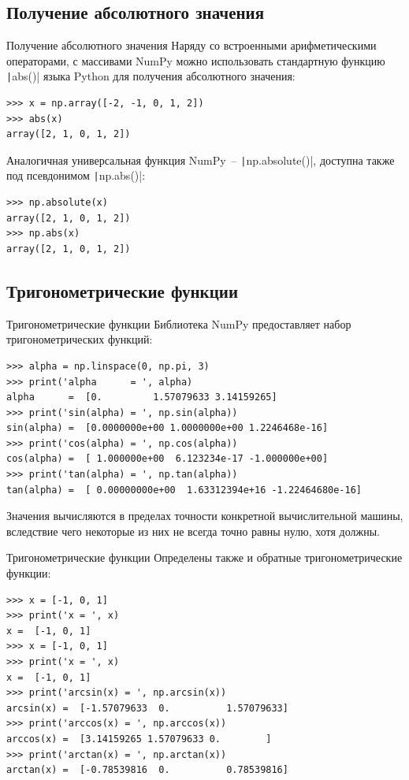 \documentclass[aspectratio=169, mathserif]{beamer}	%
\begin{document}
\subsection{Получение абсолютного значения}
\begin{frame}[fragile]{Получение абсолютного значения}
\scriptsize
Наряду со встроенными арифметическими операторами, с массивами NumPy можно использовать стандартную функцию \texttt|abs()| языка Python для получения абсолютного значения:

\begin{verbatim}
>>> x = np.array([-2, -1, 0, 1, 2])
>>> abs(x)
array([2, 1, 0, 1, 2])
\end{verbatim}

Аналогичная универсальная функция NumPy~-- \texttt|np.absolute()|, доступна также под псевдонимом \texttt|np.abs()|:

\begin{verbatim}
>>> np.absolute(x)
array([2, 1, 0, 1, 2])
>>> np.abs(x)
array([2, 1, 0, 1, 2])
\end{verbatim}
\vfil
\end{frame}

\subsection{Тригонометрические функции}
\begin{frame}[fragile]{Тригонометрические функции}
\scriptsize
Библиотека NumPy предоставляет набор тригонометрических функций:

\begin{verbatim}
>>> alpha = np.linspace(0, np.pi, 3)
>>> print('alpha      = ', alpha)
alpha      =  [0.         1.57079633 3.14159265]
>>> print('sin(alpha) = ', np.sin(alpha))
sin(alpha) =  [0.0000000e+00 1.0000000e+00 1.2246468e-16]   
>>> print('cos(alpha) = ', np.cos(alpha))
cos(alpha) =  [ 1.000000e+00  6.123234e-17 -1.000000e+00]   
>>> print('tan(alpha) = ', np.tan(alpha))
tan(alpha) =  [ 0.00000000e+00  1.63312394e+16 -1.22464680e-16]
\end{verbatim}

Значения вычисляются в пределах точности конкретной вычислительной машины, вследствие чего некоторые из них не всегда точно равны нулю, хотя должны. 
\vfill
\end{frame}

\begin{frame}[fragile]{Тригонометрические функции}
\scriptsize
Определены также  и обратные тригонометрические функции:

\begin{verbatim}
>>> x = [-1, 0, 1]
>>> print('x = ', x)
x =  [-1, 0, 1]
>>> x = [-1, 0, 1]
>>> print('x = ', x)
x =  [-1, 0, 1]
>>> print('arcsin(x) = ', np.arcsin(x))
arcsin(x) =  [-1.57079633  0.          1.57079633]   
>>> print('arccos(x) = ', np.arccos(x))
arccos(x) =  [3.14159265 1.57079633 0.        ]   
>>> print('arctan(x) = ', np.arctan(x))
arctan(x) =  [-0.78539816  0.          0.78539816]
\end{verbatim}
\vfill
\end{frame}
\end{document}
